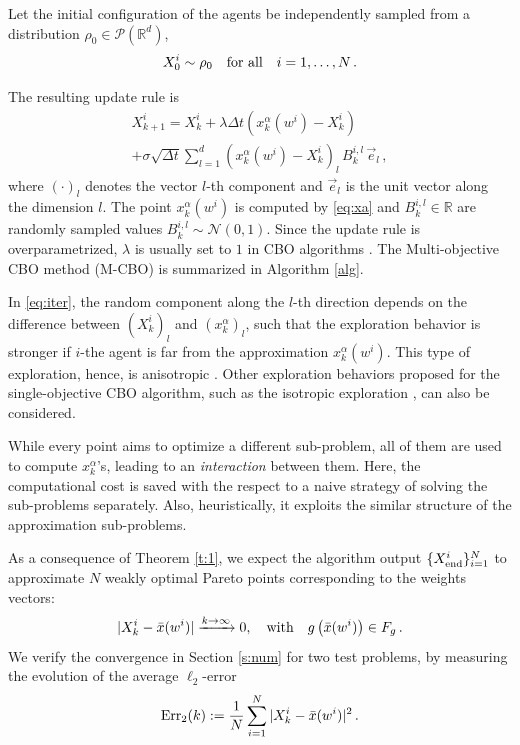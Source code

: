 \documentclass[letterpaper, 10 pt, conference]{ieeeconf}  %
\begin{document}
Let the initial configuration of the agents be independently sampled from a distribution $\rho_0 \in \mathcal{P}(\mathbb{R}^d)$,
\begin{equation}
X_0^i  \sim \rho_0 
\quad \textup{for all} \quad  i=1, \dots,N\,.
\label{eq:init}
\end{equation} 

 The resulting update rule is
\begin{multline}
X^i_{k+1} = X^i_k + \lambda\Delta t\left (x^\alpha_k(w^i) - X^i_k \right)\\
+ \sigma \sqrt{\Delta t} \sum_{l=1}^d (x^\alpha_k(w^i) - X^i_k)_l \, B_{k}^{i,l}\, \vec{e}_l \,,
\label{eq:iter}
\end{multline}
where $(\cdot)_l$ denotes the vector $l$-th component and $\vec{e}_l$ is the unit vector along the dimension $l$. The point $x_k^\alpha(w^i)$ is computed by \eqref{eq:xa} and $B^{i,l}_{k} \in \mathbb{R}$ are randomly sampled values $B^{i,l}_{k} \sim  \mathcal{N}(0, 1)$. Since the update rule is overparametrized, $\lambda$ is usually set to $1$ in CBO algorithms \cite{pinnau2017consensus, carrillo2019consensus}. The Multi-objective CBO method (M-CBO) is summarized in Algorithm \ref{alg}.

In \eqref{eq:iter}, the random component along the $l$-th direction depends on the difference between $(X^i_k)_l$ and $(x_k^\alpha)_l$, such that the exploration behavior is stronger if $i$-the agent is far from the approximation $x^\alpha_k(w^i)$. This type of exploration, hence, is anisotropic \cite{carrillo2019consensus}. Other exploration behaviors proposed for the single-objective CBO algorithm, such as the isotropic exploration \cite{pinnau2017consensus}, can also be considered.

While every point aims to optimize a different sub-problem, all of them are used to compute  $x_k^\alpha$'s, leading to an \textit{interaction} between them. 
Here, the computational cost is saved with the respect to a naive strategy of solving the sub-problems separately. 
Also, heuristically, it exploits the similar structure of the approximation sub-problems.

As a consequence of Theorem \ref{t:1}, we expect the algorithm output $\{X_{\textup{end}}^i\}_{i=1}^N$ to approximate $N$ weakly optimal Pareto points corresponding to the weights vectors:
\begin{equation}\notag
|X_{k}^i - \bar x(w^i)|\xrightarrow{k \to \infty} 0, \quad \textup{with}\quad   g\left (\bar x(w^i) \right) \in F_g\,.
\end{equation}
We verify the convergence in Section \ref{s:num} for two test problems, by measuring the evolution of the average $\ell_2$-error
\begin{equation}
\textup{Err}_{2}(k) := \frac1N \sum_{i=1}^N |X_k^i - \bar x(w^i)|^2\,.
\label{eq:err}
\end{equation} 
\end{document}
